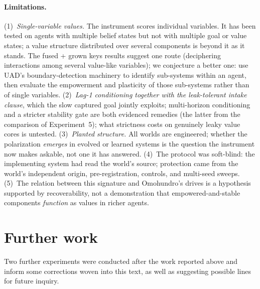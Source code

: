 \documentclass[11pt]{article}
\begin{document}
\paragraph{Limitations.}
(1)~\emph{Single-variable values.} The instrument scores individual variables. It has
been tested on agents with multiple belief states but not with multiple goal or value
states; a value structure distributed over several components is beyond it as it stands.
The fused + grown keys results suggest one route (deciphering interactions among several
value-like variables); we conjecture a better one: use UAD's boundary-detection
machinery to identify sub-systems within an agent, then evaluate the empowerment and
plasticity of those sub-systems rather than of single variables. (2)~\emph{Lag-1
conditioning together with the leak-tolerant intake clause}, which the slow captured
goal jointly exploits; multi-horizon conditioning and a stricter stability gate are
both evidenced remedies (the latter from the comparison of Experiment~5); what
strictness costs on genuinely leaky value cores is untested. (3)~\emph{Planted structure.} All worlds are engineered; whether the
polarization \emph{emerges} in evolved or learned systems is the question the instrument
now makes askable, not one it has answered. (4)~The protocol was soft-blind: the
implementing system had read the world's source; protection came from the world's
independent origin, pre-registration, controls, and multi-seed sweeps.
(5)~The relation between this signature and Omohundro's drives is a hypothesis
supported by recoverability, not a demonstration that empowered-and-stable components
\emph{function} as values in richer agents.

\section{Further work}\label{sec:further}

Two further experiments were conducted after the work reported above and inform some
corrections woven into this text, as well as suggesting possible lines for future
inquiry.
\end{document}
